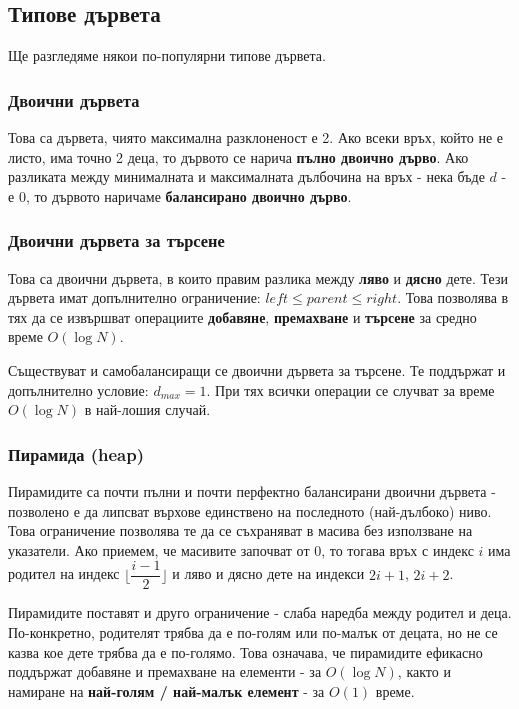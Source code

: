 \documentclass[fleqn,12pt]{article}
\begin{document}
\subsection{Типове дървета}
Ще разгледяме някои по-популярни типове дървета.

\subsubsection{Двоични дървета}
Това са дървета, чиято максимална разклоненост е 2. Ако всеки връх, който не е листо, има точно 2 деца,
то дървото се нарича \textbf{пълно двоично дърво}. Ако разликата между минималната и максималната дълбочина на връх - нека бъде $d$ - е 0, 
то дървото наричаме \textbf{балансирано двоично дърво}.

\subsubsection{Двоични дървета за търсене}
Това са двоични дървета, в които правим разлика между \textbf{ляво} и \textbf{дясно} дете.
Тези дървета имат допълнително ограничение: $left \leq parent \leq right$. 
Това позволява в тях да се извършват операциите \textbf{добавяне}, \textbf{премахване} и \textbf{търсене} за средно време $O(\log N)$.

Съществуват и самобалансиращи се двоични дървета за търсене. Те поддържат и допълнително условие: $d_{max} = 1$. При тях всички операции
се случват за време $O(\log N)$ в най-лошия случай. 

\subsubsection{Пирамида (heap)}
\label{trees:heap}
Пирамидите са почти пълни и почти перфектно балансирани двоични дървета - позволено е да липсват върхове единствено на последното (най-дълбоко) ниво.
Това ограничение позволява те да се съхраняват в масива без използване на указатели. Ако приемем, че масивите започват от 0, то тогава 
връх с индекс $i$ има родител на индекс $\Bigg\lfloor \dfrac{i - 1}{2} \Bigg\rfloor$ и ляво и дясно дете на индекси $2i + 1$, $2i + 2$.

Пирамидите поставят и друго ограничение - слаба наредба между родител и деца. По-конкретно, родителят трябва да е по-голям или по-малък
от децата, но не се казва кое дете трябва да е по-голямо. Това означава, че пирамидите ефикасно поддържат добавяне и премахване на елементи - за $O(\log N)$,
както и намиране на \textbf{най-голям / най-малък елемент} - за $O(1)$ време.
\end{document}
